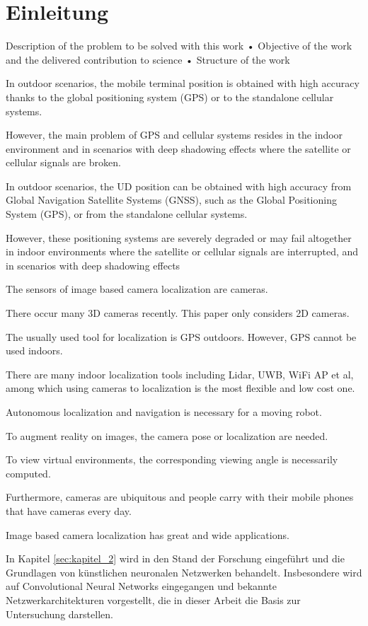 
\section{Einleitung}

Description of the problem to be solved with this work
• Objective of the work and the delivered contribution to science
• Structure of the work




In outdoor scenarios, the mobile terminal position
is obtained with high accuracy thanks to the global positioning
system (GPS) or to the standalone cellular systems. 

However, the
main problem of GPS and cellular systems resides in the indoor
environment and in scenarios with deep shadowing effects where
the satellite or cellular signals are broken.


In outdoor
scenarios, the UD position can be obtained with high accuracy
from Global Navigation Satellite Systems (GNSS), such as the
Global Positioning System (GPS), or from the standalone cellular systems. 

However, these positioning systems are severely
degraded or may fail altogether in indoor environments where
the satellite or cellular signals are interrupted, and in scenarios
with deep shadowing effects 
\cite{yassinRecentAdvancesIndoor2016}

The sensors of image based camera localization are cameras. 


There occur many 3D cameras
recently. This paper only considers 2D cameras. 


The usually used tool for localization is GPS
outdoors. However, GPS cannot be used indoors. 

There are many indoor localization tools
including Lidar, UWB, WiFi AP et al, among which using cameras to localization is the most
flexible and low cost one. 

Autonomous localization and navigation is necessary for a moving
robot. 


To augment reality on images, the camera pose or localization are needed. 

To view virtual
environments, the corresponding viewing angle is necessarily computed. 


Furthermore, cameras
are ubiquitous and people carry with their mobile phones that have cameras every day. 

Image
based camera localization has great and wide applications.
\cite{wuImageBasedCamera2016}

In Kapitel \ref{sec:kapitel_2} wird in den Stand der Forschung eingeführt und die Grundlagen von künstlichen neuronalen Netzwerken behandelt. Insbesondere wird auf Convolutional Neural Networks eingegangen und bekannte Netzwerkarchitekturen vorgestellt, die in dieser Arbeit die Basis zur Untersuchung darstellen.



